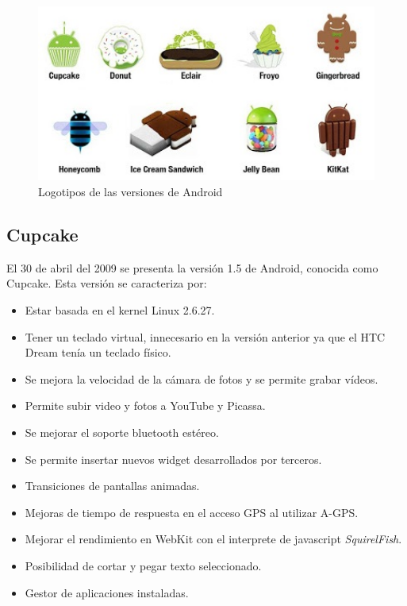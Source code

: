 \begin{figure}[!h]
\centering
\includegraphics[width=13cm]{imagenes/capitulo2/android-versiones.jpg}
\caption{Logotipos de las versiones de Android}
\end{figure}
\subsection{Cupcake} 

El 30 de abril del 2009 se presenta la versión 1.5 de Android, conocida como Cupcake. Esta versión se caracteriza por:

\begin{itemize}
\item Estar basada en el kernel Linux 2.6.27.
\item Tener un teclado virtual, innecesario en la versión anterior ya que el HTC Dream tenía un teclado físico. 
\item Se mejora la velocidad de la cámara de fotos y se permite grabar vídeos.
\item Permite subir video y fotos a YouTube y Picassa.
\item Se mejorar el soporte bluetooth estéreo.
\item Se permite insertar nuevos widget desarrollados por terceros.
\item Transiciones de pantallas animadas.
\item Mejoras de tiempo de respuesta en el acceso GPS al utilizar A-GPS.
\item Mejorar el rendimiento en WebKit con el interprete de javascript \emph{SquirelFish}.
\item Posibilidad de cortar y pegar texto seleccionado.
\item Gestor de aplicaciones instaladas.
\end{itemize} 

